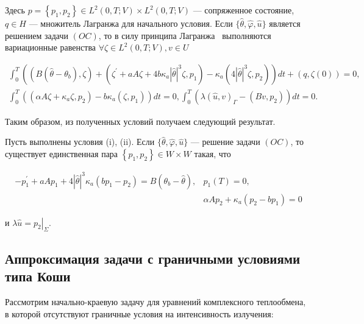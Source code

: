 Здесь $p=\left\{p_{1}, p_{2}\right\} \in L^{2}(0, T; V) \times L^{2}(0, T; V) $
— сопряженное состояние, $q \in H$ — множитель Лагранжа для начального условия.
Если $\{\widehat{\theta}, \widehat{\varphi}, \widehat{u}\}$
является решением задачи $(OC)$, то в силу принципа
Лагранжа~\cite[гл. 2, теорема 1.5]{10} выполняются вариационные равенства
$\forall \zeta \in L^{2}(0, T ; V), v \in U$

\[
    \begin{gathered}
        \int_{0}^{T}\left(\left(B\left(\widehat{\theta}-\theta_{b}\right),
        \zeta\right)+\left(\zeta^{\prime}
        +a A \zeta+4 b \kappa_{a}|\widehat{\theta}|^{3} \zeta, p_{1}\right)
        -\kappa_{a}\left(4|\widehat{\theta}|^{3} \zeta,
        p_{2}\right)\right) d t+(q, \zeta(0))=0, \\
        \int_{0}^{T}\left(\left(\alpha A \zeta
        +\kappa_{a} \zeta, p_{2}\right)
        -b \kappa_{a}\left(\zeta, p_{1}\right)\right) d t=0,
        \int_{0}^{T}\left(\lambda(\widehat{u}, v)_{\Gamma}
        -\left(B v, p_{2}\right)\right) d t=0.
    \end{gathered}
\]

Таким образом, из полученных условий получаем следующий результат.

\begin{theorem}
    \label{th:2_3:2}
    Пусть выполнены условия (i), (ii).
    Если $\{\widehat{\theta}, \widehat{\varphi}, \widehat{u}\}$ — решение задачи $(OC)$,
    то существует единственная пара $\left\{p_ {1}, p_{2}\right\} \in W \times W$ такая, что

    \begin{equation}
        \label{eq:2_3:15}
        \begin{aligned}
            -p_{1}^{\prime}+a A p_{1}+4|\widehat{\theta}|^{3} \kappa_{a}\left(b p_{1}-p_{2}\right)=
            B\left(\theta_{b}-\widehat{\theta}\right), & p_{1}(T)=0, \\
            & \alpha A p_{2}+\kappa_{a}\left(p_{2}-b p_{1}\right)=0
        \end{aligned}
    \end{equation}

    и $\lambda \widehat{u}=\left.p_{2}\right|_{\Sigma}$.
\end{theorem}

\subsection{Аппроксимация задачи с граничными условиями типа Коши}
\label{subsec:ch2/sec3/approximation}
Рассмотрим начально-краевую задачу для уравнений комплексного
теплообмена, в которой отсутствуют граничные условия на интенсивность излучения:

